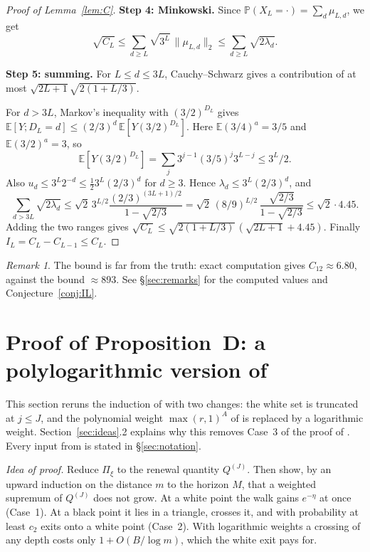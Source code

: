 \documentclass[11pt]{amsart}
\theoremstyle{remark}
\newtheorem{remark}{Remark}[section]
\newcommand{\E}{\mathbb{E}}
\renewcommand{\P}{\mathbb{P}}
\newcommand{\T}[1]{\cite[#1]{Tao22}}   %
\theoremstyle{plain}
\begin{document}
\begin{proof}[Proof of Lemma~\ref{lem:C}]
\textbf{Step 4: Minkowski.} Since $\P(X_L=\cdot)=\sum_d\mu_{L,d}$, we get
\[
\sqrt{C_L}\le\sum_{d\ge L}\sqrt{3^L}\,\|\mu_{L,d}\|_2\le\sum_{d\ge L}\sqrt{2\lambda_d}.
\]

\textbf{Step 5: summing.} For $L\le d\le3L$, Cauchy--Schwarz gives a contribution of at most $\sqrt{2L+1}\sqrt{2(1+L/3)}$.

For $d>3L$, Markov's inequality with $(3/2)^{D_L}$ gives $\E[Y;D_L=d]\le(2/3)^d\,\E[Y(3/2)^{D_L}]$. Here $\E(3/4)^a=3/5$ and $\E(3/2)^a=3$, so
\[
\E[Y(3/2)^{D_L}]=\sum_j3^{j-1}(3/5)^j3^{L-j}\le3^L/2 .
\]
Also $u_d\le3^L2^{-d}\le\tfrac12 3^L(2/3)^d$ for $d\ge3$. Hence $\lambda_d\le3^L(2/3)^d$, and
\[
\sum_{d>3L}\sqrt{2\lambda_d}\le\sqrt2\,3^{L/2}\frac{(2/3)^{(3L+1)/2}}{1-\sqrt{2/3}}=\sqrt2\,(8/9)^{L/2}\,\frac{\sqrt{2/3}}{1-\sqrt{2/3}}\le\sqrt2\cdot4.45 .
\]
Adding the two ranges gives $\sqrt{C_L}\le\sqrt{2(1+L/3)}\,(\sqrt{2L+1}+4.45)$. Finally $I_L=C_L-C_{L-1}\le C_L$.
\end{proof}

\begin{remark}\label{rem:C-loose}
The bound is far from the truth: exact computation gives $C_{12}\approx6.80$, against the bound $\approx893$. See \S\ref{sec:remarks} for the computed values and Conjecture~\ref{conj:IL}.
\end{remark}

\section[Proof of Proposition D]{Proof of Proposition~D: a polylogarithmic version of \T{Proposition 7.3}}\label{sec:D}

This section reruns the induction of \T{\S7.4} with two changes: the white set is truncated at $j\le J$, and the polynomial weight $\max(r,1)^A$ of \T{(7.37)--(7.38)} is replaced by a logarithmic weight. Section~\ref{sec:ideas}.2 explains why this removes Case~3 of the proof of \T{Proposition 7.8}. Every input from \T{\S7} is stated in \S\ref{sec:notation}.

\emph{Idea of proof.} Reduce $\Pi_\xi$ to the renewal quantity $Q^{(J)}$. Then show, by an upward induction on the distance $m$ to the horizon $M$, that a weighted supremum of $Q^{(J)}$ does not grow. At a white point the walk gains $e^{-\eta}$ at once (Case~1). At a black point it lies in a triangle, crosses it, and with probability at least $c_2$ exits onto a white point (Case~2). With logarithmic weights a crossing of any depth costs only $1+O(B/\log m)$, which the white exit pays for.
\end{document}
